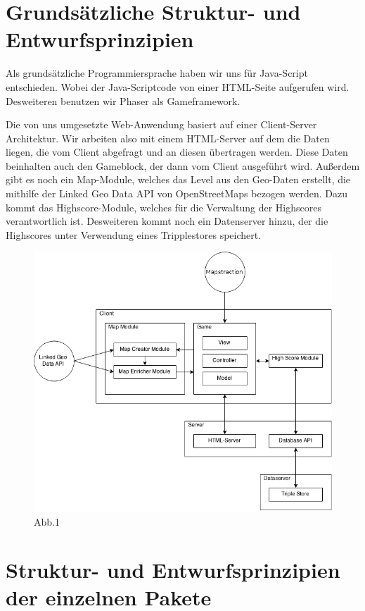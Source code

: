 \documentclass[11pt,a4paper]{article}
\begin{document}
\section{Grundsätzliche Struktur- und Entwurfsprinzipien}
Als grundsätzliche Programmiersprache haben wir uns für Java-Script entschieden. Wobei der Java-Scriptcode von einer HTML-Seite aufgerufen wird. Desweiteren benutzen wir Phaser als Gameframework.

Die von uns umgesetzte Web-Anwendung basiert auf einer Client-Server Architektur. Wir arbeiten also mit einem HTML-Server auf dem die Daten liegen, die vom Client abgefragt und an diesen übertragen werden. Diese Daten beinhalten auch den Gameblock, der dann vom Client ausgeführt wird. Außerdem gibt es noch ein Map-Module, welches das Level aus den Geo-Daten erstellt, die mithilfe der Linked Geo Data API von OpenStreetMaps bezogen werden. Dazu kommt das Highscore-Module, welches für die Verwaltung der Highscores verantwortlich ist. Desweiteren kommt noch ein Datenserver hinzu, der die Highscores unter Verwendung eines Tripplestores speichert.\\
\begin{figure}[htb]
  \centering
  \includegraphics[scale=0.4]{arch.png}
\caption{Abb.1}
  \label{PNFs}
\end{figure} 



\section{Struktur- und Entwurfsprinzipien der einzelnen Pakete}
\end{document}

